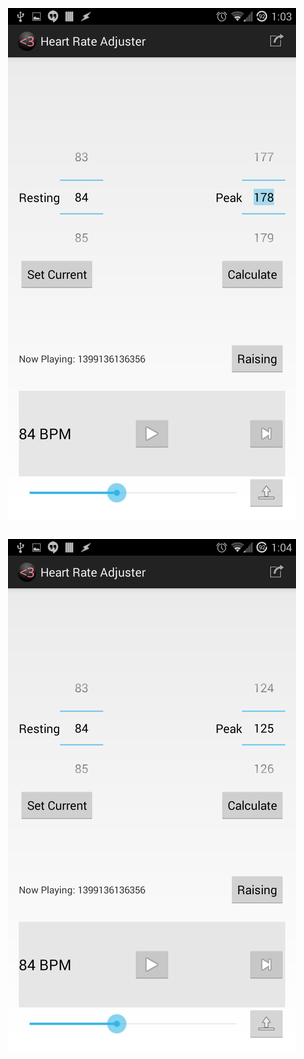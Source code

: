 \documentclass[letterpaper,english, 12pt]{scrreprt}
\begin{document}
\begin{figure}[H]
	\centering
	\includegraphics{img/Prelim_Design/2.png}\\
\end{figure}
\begin{figure}[H]
	\centering
	\includegraphics{img/Prelim_Design/4.png}\\
\end{figure}
\end{document}
